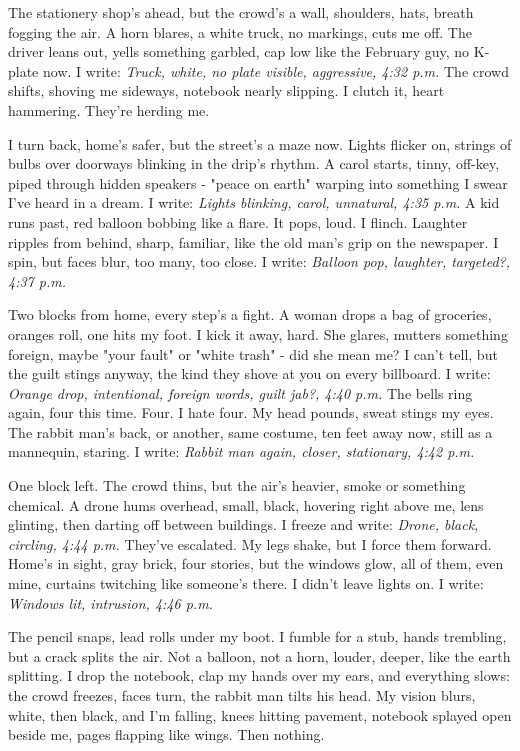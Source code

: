 \documentclass{article}
\begin{document}
The stationery shop's ahead, but the crowd's a wall, shoulders, hats, breath fogging the air. A horn blares, a white truck, no markings, cuts me off. The driver leans out, yells something garbled, cap low like the February guy, no K-plate now. I write: \textit{Truck, white, no plate visible, aggressive, 4:32 p.m.} The crowd shifts, shoving me sideways, notebook nearly slipping. I clutch it, heart hammering. They're herding me.

I turn back, home's safer, but the street's a maze now. Lights flicker on, strings of bulbs over doorways blinking in the drip's rhythm. A carol starts, tinny, off-key, piped through hidden speakers - "peace on earth" warping into something I swear I've heard in a dream. I write: \textit{Lights blinking, carol, unnatural, 4:35 p.m.} A kid runs past, red balloon bobbing like a flare. It pops, loud. I flinch. Laughter ripples from behind, sharp, familiar, like the old man's grip on the newspaper. I spin, but faces blur, too many, too close. I write: \textit{Balloon pop, laughter, targeted?, 4:37 p.m.}

Two blocks from home, every step's a fight. A woman drops a bag of groceries, oranges roll, one hits my foot. I kick it away, hard. She glares, mutters something foreign, maybe "your fault" or "white trash" - did she mean me? I can't tell, but the guilt stings anyway, the kind they shove at you on every billboard. I write: \textit{Orange drop, intentional, foreign words, guilt jab?, 4:40 p.m.} The bells ring again, four this time. Four. I hate four. My head pounds, sweat stings my eyes. The rabbit man's back, or another, same costume, ten feet away now, still as a mannequin, staring. I write: \textit{Rabbit man again, closer, stationary, 4:42 p.m.}

One block left. The crowd thins, but the air's heavier, smoke or something chemical. A drone hums overhead, small, black, hovering right above me, lens glinting, then darting off between buildings. I freeze and write: \textit{Drone, black, circling, 4:44 p.m.} They've escalated. My legs shake, but I force them forward. Home's in sight, gray brick, four stories, but the windows glow, all of them, even mine, curtains twitching like someone's there. I didn't leave lights on. I write: \textit{Windows lit, intrusion, 4:46 p.m.}

The pencil snaps, lead rolls under my boot. I fumble for a stub, hands trembling, but a crack splits the air. Not a balloon, not a horn, louder, deeper, like the earth splitting. I drop the notebook, clap my hands over my ears, and everything slows: the crowd freezes, faces turn, the rabbit man tilts his head. My vision blurs, white, then black, and I'm falling, knees hitting pavement, notebook splayed open beside me, pages flapping like wings. Then nothing.
\end{document}
